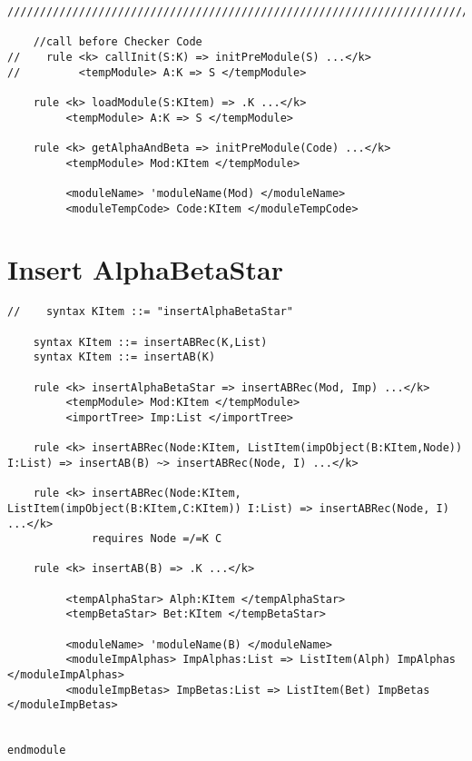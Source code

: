 \begin{lstlisting}
////////////////////////////////////////////////////////////////////////////////////////////////////////////////////////

    //call before Checker Code
//    rule <k> callInit(S:K) => initPreModule(S) ...</k>
//         <tempModule> A:K => S </tempModule>

    rule <k> loadModule(S:KItem) => .K ...</k>
         <tempModule> A:K => S </tempModule>

    rule <k> getAlphaAndBeta => initPreModule(Code) ...</k>
         <tempModule> Mod:KItem </tempModule>

         <moduleName> 'moduleName(Mod) </moduleName>
         <moduleTempCode> Code:KItem </moduleTempCode>
\end{lstlisting}

\section{Insert AlphaBetaStar}
\begin{lstlisting}
//    syntax KItem ::= "insertAlphaBetaStar"

    syntax KItem ::= insertABRec(K,List)
    syntax KItem ::= insertAB(K)

    rule <k> insertAlphaBetaStar => insertABRec(Mod, Imp) ...</k>
         <tempModule> Mod:KItem </tempModule>
         <importTree> Imp:List </importTree>

    rule <k> insertABRec(Node:KItem, ListItem(impObject(B:KItem,Node)) I:List) => insertAB(B) ~> insertABRec(Node, I) ...</k>

    rule <k> insertABRec(Node:KItem, ListItem(impObject(B:KItem,C:KItem)) I:List) => insertABRec(Node, I) ...</k>
             requires Node =/=K C

    rule <k> insertAB(B) => .K ...</k>

         <tempAlphaStar> Alph:KItem </tempAlphaStar>
         <tempBetaStar> Bet:KItem </tempBetaStar>

         <moduleName> 'moduleName(B) </moduleName>
         <moduleImpAlphas> ImpAlphas:List => ListItem(Alph) ImpAlphas </moduleImpAlphas>
         <moduleImpBetas> ImpBetas:List => ListItem(Bet) ImpBetas </moduleImpBetas>


endmodule
\end{lstlisting}